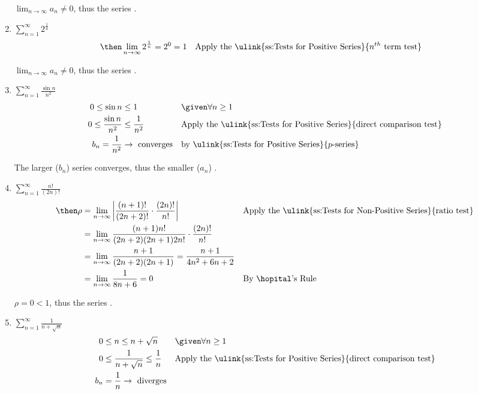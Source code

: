 \begin{enumerate}[itemsep=12em]
    \(\lim_{n \to \infty} a_n \neq 0\), thus the series .

  \item \(\displaystyle \sum_{n=1}^{\infty} 2^\frac{1}{n} \)
    \begin{align*}
      &\then \lim_{n \to \infty} 2^{\frac{1}{n}} = 2^0 = 1
      && \text{Apply the \ulink{ss:Tests for Positive Series}{\(n^{th} \) term test}}
    \end{align*}

    \(\lim_{n \to \infty} a_n \neq 0\), thus the series .

  \vspace{-16pt}
  \item \(\displaystyle \sum_{n=1}^{\infty} \frac{\sin n}{n^2} \)
    \begin{align*}
      0 \leq \sin  n &\leq 1 && \given \forall n \geq 1 \\
      0 \leq \frac{\sin n}{n^2} &\leq \frac{1}{n^2}
      && \text{Apply the \ulink{ss:Tests for Positive Series}{direct comparison test}} \\
      b_n = \frac{1}{n^2} &\to ~\text{converges}
      && \text{by \ulink{ss:Tests for Positive Series}{\(p\)-series}}
    \end{align*}

    The larger (\(b_n\)) series converges, thus the smaller (\(a_n\)) .

  \vspace{-16pt}
  \item \(\displaystyle \sum_{n=1}^{\infty} \frac{n!}{(2n)!} \)
    \begin{align*}
      \then \rho &= \lim_{n \to \infty} \left|
     \frac{(n+1)!}{(2n+2)!} \cdot \frac{(2n)!}{n!} \right|
     && \text{Apply the \ulink{ss:Tests for Non-Positive Series}{ratio test}} \\
     &=\lim_{n \to \infty}
     \frac{(n+1)n!}{(2n+2)(2n+1)2n!} \cdot \frac{(2n)!}{n!} \\
     &=\lim_{n \to \infty}
     \frac{n+1}{(2n+2)(2n+1)} =
     \frac{n+1}{4n^2+6n+2} \\
     &=\lim_{n \to \infty} \frac{1}{8n + 6} = 0
     && \text{By \hopital's Rule} \\
    \end{align*}

  \(\rho = 0 < 1\), thus the series .

  \vspace{-16pt}
  \item \(\displaystyle \sum_{n=1}^{\infty} \frac{1}{n + \sqrt{n} } \)
    \begin{align*}
      0 &\leq n \leq n +\sqrt{n}  && \given \forall n \geq 1 \\
      0 &\leq \frac{1}{n+\sqrt{n} } \leq \frac{1}{n}
      && \text{Apply the \ulink{ss:Tests for Positive Series}{direct comparison test}} \\
      b_n &= \frac{1}{n} \to ~\text{diverges}
    \end{align*}


\end{enumerate}
